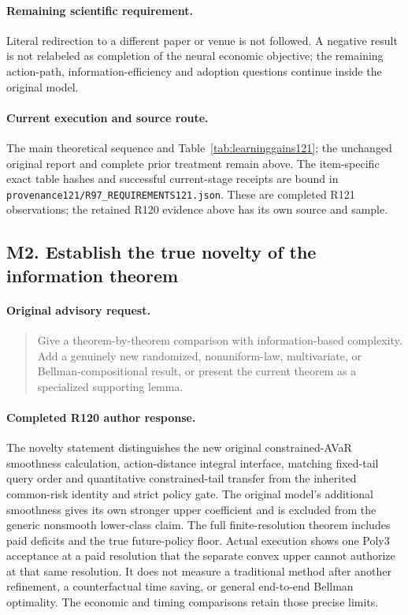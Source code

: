 \paragraph{Remaining scientific requirement.}
Literal redirection to a different paper or venue is not followed. A negative result is not relabeled as completion of the neural economic objective; the remaining action-path, information-efficiency and adoption questions continue inside the original model.

\paragraph{Current execution and source route.}
The main theoretical sequence and Table~\ref{tab:learninggains121}; the unchanged original report and complete prior treatment remain above.
The item-specific exact table hashes and successful current-stage receipts are bound in \nolinkurl{provenance121/R97_REQUIREMENTS121.json}. These are completed R121 observations; the retained R120 evidence above has its own source and sample.

\subsection{M2. Establish the true novelty of the information theorem}
\label{response121:M2}

\paragraph{Original advisory request.}
\begin{quote}
Give a theorem-by-theorem comparison with information-based complexity. Add a genuinely new randomized, nonuniform-law, multivariate, or Bellman-compositional result, or present the current theorem as a specialized supporting lemma.
\end{quote}

\paragraph{Completed R120 author response.}
The novelty statement distinguishes the new original constrained-AVaR smoothness calculation, action-distance integral interface, matching fixed-tail query order and quantitative constrained-tail transfer from the inherited common-risk identity and strict policy gate. The original model's additional smoothness gives its own stronger upper coefficient and is excluded from the generic nonsmooth lower-class claim. The full finite-resolution theorem includes paid deficits and the true future-policy floor. Actual execution shows one Poly3 acceptance at a paid resolution that the separate convex upper cannot authorize at that same resolution. It does not measure a traditional method after another refinement, a counterfactual time saving, or general end-to-end Bellman optimality. The economic and timing comparisons retain those precise limits.

